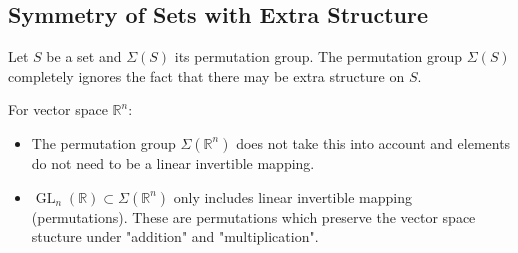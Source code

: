 \documentclass{article}
\newcommand{\GL}{\operatorname{GL}}
\begin{document}
\subsection{Symmetry of Sets with Extra Structure}
Let $S$ be a set and $\Sigma(S)$ its permutation group. The permutation group  $\Sigma(S)$ completely ignores the fact that there may be extra structure on $S$.

For vector space $\mathbb{R}^{n}$:
\begin{itemize}
    \item The permutation group $\Sigma\left(\mathbb{R}^{n}\right)$ does not take this into account and elements do not need to be a linear invertible mapping.
    \item $\GL_{n}(\mathbb{R})\subset \Sigma\left(\mathbb{R}^{n}\right)$ only includes linear invertible mapping (permutations).  These are permutations which preserve the vector space stucture under "addition" and "multiplication".
\end{itemize}
\end{document}
